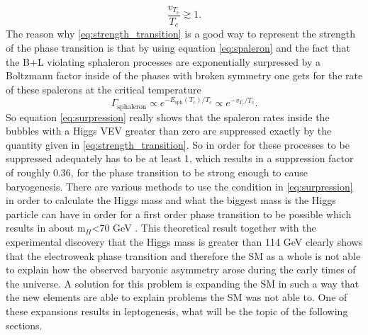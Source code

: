 \begin{equation}
	\frac{v_{T_c}}{T_c}\gtrsim1.
	\label{eq:strength_transition}
\end{equation}
The reason why \eqref{eq:strength_transition} is a good way to represent the strength of the phase transition is that by using equation \eqref{eq:spaleron} and the fact that the B+L violating sphaleron processes are exponentially surpressed by a Boltzmann factor inside of the phases with broken symmetry one gets for the rate of these spalerons at the critical temperature
\begin{equation}
	\Gamma_\text{sphaleron}\propto e^{-E_\text{sph}(T_c)/T_c}\propto e^{-v_{T_c}/T_c}.
	\label{eq:surpression}
\end{equation}
So equation \eqref{eq:surpression} really shows that the spaleron rates inside the bubbles with a Higgs VEV greater than zero are suppressed exactly by the quantity given in \eqref{eq:strength_transition}. So in order for these processes to be suppressed adequately has to be at least 1, which results in a suppression factor of roughly 0.36, for the phase transition to be strong enough to cause baryogenesis. \newline\indent 
There are various methods to use the condition in \eqref{eq:surpression} in order to calculate the Higgs mass and what the biggest mass is the Higgs particle can have in order for a first order phase transition to be possible which results in about m$_H$<70 GeV \cite[pp. 3f.]{Fodor:1999at}. \newline\indent
This theoretical result together with the experimental discovery that the Higgs mass is greater than 114 GeV \cite[pp. 100ff.]{Abbaneo:2001ix} clearly shows that the electroweak phase transition and therefore the SM as a whole is not able to explain how the observed baryonic asymmetry arose during the early times of the universe. \newline\indent
A solution for this problem is expanding the SM in such a way that the new elements are able to explain problems the SM was not able to. One of these expansions results in leptogenesis, what will be the topic of the following sections.